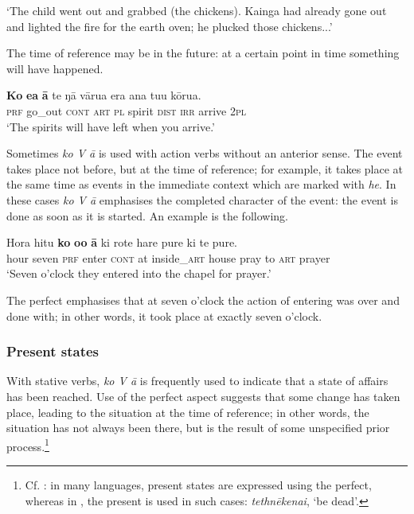 \glt 
‘The child went out and grabbed (the chickens). Kainga had already gone out and lighted the fire for the earth oven; he plucked those chickens...’ \textstyleExampleref{[Ley-8-53.004]}
\z

The time of reference may be in the future: at a certain point in time something will have happened. 

\ea\label{ex:7.60}
\gll \textbf{Ko} \textbf{e{\ꞌ}a} \textbf{{\ꞌ}ā} te ŋā vārua era ana tu{\ꞌ}u kōrua. \\
\textsc{prf} go\_out \textsc{cont} \textsc{art} \textsc{pl} spirit \textsc{dist} \textsc{irr} arrive \textsc{2pl} \\

\glt 
‘The spirits will have left when you arrive.’ \textstyleExampleref{[R310.273]} 
\z

Sometimes \textit{ko V {\ꞌ}ā} is used with action verbs without an anterior sense. The event takes place not before, but at the time of reference; for example, it takes place at the same time as events in the immediate context which are marked with \textit{he}. In these cases \textit{ko V {\ꞌ}ā} emphasises the completed character of the event: the event is done as soon as it is started. An example is the following.

\ea\label{ex:7.61}
\gll Hora hitu \textbf{ko} \textbf{o{\ꞌ}o} \textbf{{\ꞌ}ā} ki rote hare pure ki te pure. \\
hour seven \textsc{prf} enter \textsc{cont} at inside\_\textsc{art} house pray to \textsc{art} prayer \\

\glt
‘Seven o’clock they entered into the chapel for prayer.’ \textstyleExampleref{[R210.140]} 
\z

The perfect emphasises that at seven o’clock the action of entering was over and done with; in other words, it took place at exactly seven o’clock. 

\subsubsection[Present states]{Present states}\label{sec:7.2.7.2}

With stative verbs, \textit{ko V {\ꞌ}ā} is frequently used to indicate that a state of affairs has been reached. Use of the perfect aspect suggests that some change has taken place, leading to the situation at the time of reference; in other words, the situation has not always been there, but is the result of some unspecified prior process.\footnote{\label{fn:334}Cf. \citet[57]{Comrie1976}: in many languages, present states are expressed using the perfect, whereas in , the present is used in such cases:  \textit{tethnēkenai},  ‘be dead’.} 

